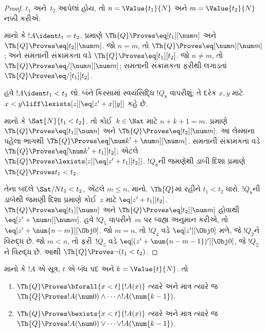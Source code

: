 \begin{proof}
$t_1$ અને~$t_2$ આપેલાં હોય,
તો $n = \Value{t_1}{N}$ અને
$m = \Value{t_2}{N}$ નક્કી કરીએ.

માનો કે $!A \ident t_1 = t_2$.
પ્રમાણે $\Th{Q} \Proves
\eq[t_1][\num n]$ અને
$\Th{Q} \Proves \eq[t_2][\num m]$.
જો $n = m$, તો
$\Th{Q} \Proves \eq[\num n][\num m]$;
અને સમતાની સંક્રામકતા વડે
$\Th{Q} \Proves \eq[t_1][t_2]$.
જો $n \neq m$, તો
$\Th{Q} \Proves \eq/[\num n][\num m]$;
સમતાની સંક્રામકતા ફરીથી
લગાડતાં $\Th{Q} \Proves
\eq/[t_1][t_2]$.

હવે $!A \ident t_1 < t_2$
લો. બંને કિસ્સામાં સ્વયંસિદ્ધિ
$!Q_8$ વાપરીશું; તે દરેક
$x,y$ માટે
$x < y \liff
\lexists[z][\eq[z' + x][y]]$
કહે છે.

માનો કે $\Sat{N}{t_1 < t_2}$.
તો કોઈ~$k \in \Nat$ માટે
$n + k + 1 = m$.
પ્રમાણે $\Th{Q} \Proves
\eq[t_1][\num n]$ અને
$\Th{Q} \Proves \eq[t_2][\num m]$.
આ લેમ્માના પહેલા ભાગથી
$\Th{Q} \Proves
\eq[{\num k}' + \num n][\num m]$.
સમતાની સંક્રામકતા વડે
$\Th{Q} \Proves
\eq[{\num k}' + t_1][t_2]$;
એટલે $\Th{Q} \Proves
\lexists[z][\eq[z' + t_1][t_2]]$.
$!Q_8$ની જમણેથી ડાબી
દિશા પ્રમાણે $\Th{Q} \Proves
t_1 < t_2$.

તેના બદલે $\Sat/{N}{t_1 < t_2}$,
એટલે $m \leq n$, માનો.
$\Th{Q}$માં રહીને
$t_1 < t_2$ ધારો. $!Q_8$ની
ડાબેથી જમણી દિશા પ્રમાણે
કોઈ~$z$ માટે
$\eq[z' + t_1][t_2]$.
$\Th{Q} \Proves
\eq[t_1][\num n]$ અને
$\Th{Q} \Proves \eq[t_2][\num m]$
હોવાથી
$\eq[z' + \num n][\num m]$.
હવે $!Q_5$ વાપરીને~$m$
પર બાહ્ય અનુમાન કરીએ, તો
$\eq[z' + \num{n - m}][\Obj 0]$.
જો $m = n$, તો $!Q_4$
વડે $\eq[z'][\Obj 0]$ મળે,
જે $!Q_2$ને વિરુદ્ધ છે.
જો $m < n$, તો ફરી~$!Q_5$
વડે
$\eq[(z' + \num{n - m - 1})'][\Obj 0]$,
જે $!Q_2$ને વિરુદ્ધ છે.
આથી $\Th{Q} \Proves
\lnot(t_1 < t_2)$.
\end{proof}

\begin{lem}
માનો કે $!A$ એ સૂત્ર,
$t$ એ બંધ પદ અને
$k=\Value{t}{N}$. તો
\begin{enumerate}
\item $\Th{Q} \Proves \bforall{x<t}{!A(x)}$
ત્યારે અને માત્ર ત્યારે જ
$\Th{Q} \Proves
    !A(\num 0) \land \dots \land !A(\num{k-1})$.
\item $\Th{Q} \Proves \bexists{x<t}{!A(x)}$
ત્યારે અને માત્ર ત્યારે જ
$\Th{Q} \Proves
    !A(\num 0) \lor \dots \lor !A(\num{k-1})$.
\end{enumerate}
\end{lem}

